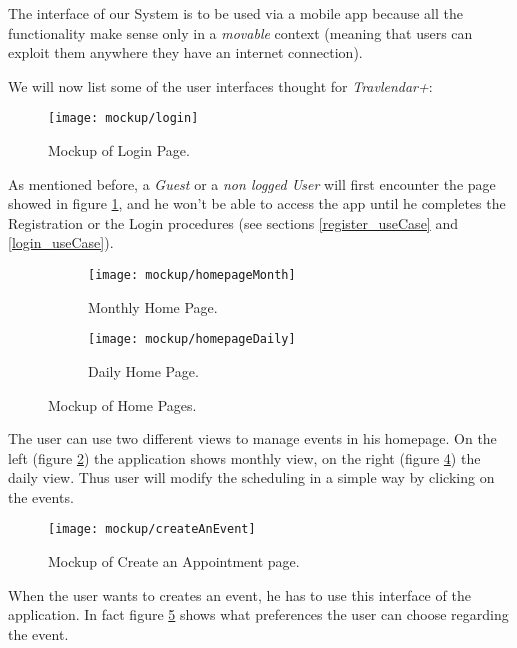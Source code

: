 The interface of our System is to be used via a mobile app because all the functionality make sense only in a \textit{movable} context (meaning that users can exploit them anywhere they have an internet connection).

We will now list some of the user interfaces thought for \textit{Travlendar+}:

\begin{figure}[h]
	\texttt{[image: mockup/login]}
	\centering
	\caption{Mockup of Login Page.}
	\label{fig:login}
\end{figure}
	As mentioned before, a \textit{Guest} or a \textit{non logged User} will first encounter the page showed in figure \ref{fig:login}, and he won't be able to access the app until he completes the Registration or the Login procedures (see sections \ref{register_useCase} and \ref{login_useCase}).



\begin{figure}[H]
	\begin{subfigure}{0.5\textwidth}
		\texttt{[image: mockup/homepageMonth]} 
		\centering
		\caption{Monthly Home Page.}
		\label{fig:homePage_Month}
	\end{subfigure}
	\begin{subfigure}{0.5\textwidth}
		\texttt{[image: mockup/homepageDaily]} 
		\centering
		\caption{Daily Home Page.}
		\label{fig:homePage_Day}
	\end{subfigure}
	\caption{Mockup of Home Pages.}
\end{figure}

	The user can use two different views to manage events in his homepage. On the left (figure \ref{fig:homePage_Month}) the application shows monthly view, on the right (figure \ref{fig:homePage_Day}) the daily view. Thus user will modify the scheduling in a simple way by clicking on the events.



\begin{figure}[H]
	\texttt{[image: mockup/createAnEvent]}
	\centering
	\caption{Mockup of Create an Appointment page.}
	\label{fig:createEvent}
\end{figure}
	
	When the user wants to creates an event, he has to use this interface of the application. In fact figure \ref{fig:createEvent} shows what preferences the user can choose regarding the event.


